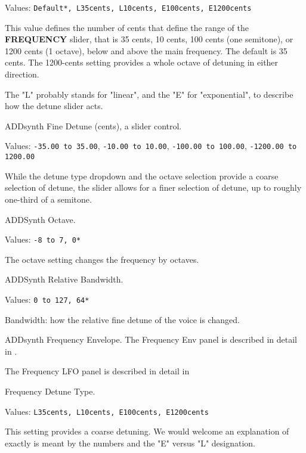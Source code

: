    Values: \texttt{Default*, L35cents, L10cents, E100cents, E1200cents}

   This value defines the number of cents that define the range of the
   \textbf{FREQUENCY} slider, that is 35 cents, 10 cents, 100 cents (one
   semitone), or 1200 cents (1 octave), below and above the main
   frequency.  The default is 35 cents.  The 1200-cents setting provides a
   whole octave of detuning in either direction.

   The "L" probably stands for "linear", and the "E" for "exponential", to
   describe how the detune slider acts.

   ADDsynth Fine Detune (cents), a slider control.

   Values:
      \texttt{-35.00 to 35.00},
      \texttt{-10.00 to 10.00},
      \texttt{-100.00 to 100.00},
      \texttt{-1200.00 to 1200.00}

   While the detune type dropdown and the octave selection provide a coarse
   selection of detune, the slider allows for a finer selection of detune,
   up to roughly one-third of a semitone.

   ADDSynth Octave.

   Values: \texttt{-8 to 7, 0*}

   The octave setting changes the frequency by octaves.

   ADDSynth Relative Bandwidth.

   Values: \texttt{0 to 127, 64*}

   Bandwidth: how the relative fine detune of the voice is changed.

   ADDsynth Frequency Envelope.
   The Frequency Env panel is described in detail in
   .

   The Frequency LFO panel is described in detail in

   Frequency Detune Type.

   Values: \texttt{L35cents, L10cents, E100cents, E1200cents}

   This setting provides a coarse detuning.
   We would welcome an explanation of exactly is meant by the numbers and
   the "E" versus "L" designation.

